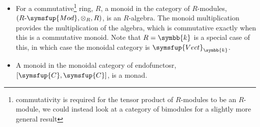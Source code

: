 \documentclass[fleqn]{NotesClass}
\makeatletter
\newcommand{\cat}[1]{\symsfup{#1}}
\newcommand{\c@egory}[1]{\symsfup{#1}}
\newcommand{\Vect}[1][\field]{\c@egory{Vect}_{#1}}
\newcommand{\RMod}[1][R]{#1\text{-}\c@egory{Mod}}
\renewcommand{\field}{\symbb{k}}
\makeatother
\begin{document}
\begin{exm}{}{}
\begin{itemize}
            \item For a commutative\footnote{commutativity is required for the tensor product of \(R\)-modules to be an \(R\)-module, we could instead look at a category of bimodules for a slightly more general result} ring, \(R\), a monoid in the category of \(R\)-modules, \((\RMod, \otimes_{R}, R)\), is an \(R\)-algebra.
            The monoid multiplication provides the multiplication of the algebra, which is commutative exactly when this is a commutative monoid.
            Note that \(R = \field\) is a special case of this, in which case the monoidal category is \(\Vect\).
            
            \item A monoid in the monoidal category of endofunctosr, \([\cat{C}, \cat{C}]\), is a monad.
        \end{itemize}
    \end{exm}
    
    
    \backmatter
    \renewcommand{\glossaryname}{Acronyms}
    \printglossary[acronym]
    \printindex
\end{document}
